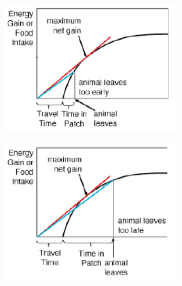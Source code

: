 \documentclass{mproj}
\begin{document}
\begin{figure}[!h]
        \centering
	\caption {The optimal rate of gain}
	\label{fig:gain tangent}
        \begin{subfigure} [h] {0.49\textwidth}
                \centering
                \includegraphics [width=1\textwidth] {gain2.png}
        \end{subfigure}
        \space
        \space
        \begin{subfigure} [h] {0.49\textwidth}
                \centering
                \includegraphics [width=1\textwidth] {gain3.png}
        \end{subfigure}
\end{figure}
\end{document}
